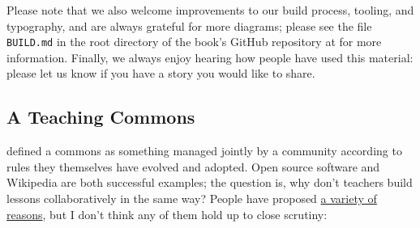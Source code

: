Please note that we also welcome improvements to our build process,
tooling, and typography, and are always grateful for more diagrams;
please see the file \texttt{BUILD.md} in the root directory of the
book's GitHub repository at {\repository} for more information.
Finally, we always enjoy hearing how people have used this material:
please let us know if you have a story you would like to share.

\subsection*{A Teaching Commons}

 defined a commons as something managed
jointly by a community according to rules they themselves have evolved
and adopted.  Open source software and Wikipedia are both successful
examples; the question is, why don't teachers build lessons
collaboratively in the same way?  People have proposed
\href{http://blog.mrmeyer.com/2016/why-secondary-teachers-dont-want-a-github-for-lesson-plans/}{a
  variety of reasons}, but I don't think any of them hold up to close
scrutiny:

